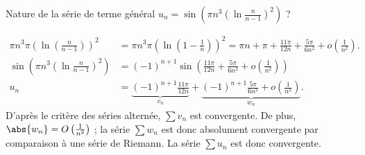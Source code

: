 \begin{enonce}
\begin{exercise}[ID={RMS121/2 E648,Mines-Pont PC},subtitle={},tags={}, difficulty={0}]
Nature de la série de terme général $u_n=\sin\left( \pi n^3\left( \ln\frac{n}{n-1} \right)^2  \right)$ ? 
\end{exercise}
\begin{solution}
\begin{align*}
    \pi n^3\pi \left(\ln\left( \frac{n}{n-1} \right) \right)^2 
&=\pi n^3\pi \left(\ln\left( 1-\frac1n \right) \right)^2 
  = \pi n+\pi +\frac{11\pi }{12 n}+\frac{5\pi }{6{n}^{2}}+o\left(\frac1{n^2}\right).\\
\sin\left( \pi n^3\left( \ln\frac{n}{n-1} \right)^2  \right)
  &= (-1)^{n+1}\sin\left( \frac{11\pi }{12 n}+\frac{5\pi }{6{n}^{2}} +o\left(\frac1{n^2}\right) \right) \\
  u_n&= \underbrace{(-1)^{n+1}\frac{11\pi}{12 n}}_{v_n} + \underbrace{(-1)^{n+1}\frac{5\pi}{6n^2} + o\left(\frac1{n^2}\right)}_{w_n}.
\end{align*}
  D'après le critère des séries alternée, $\sum v_n$ est convergente. De plus, $\abs{w_n}=O\left(\frac1{n^2}\right)$ ; la série $\sum w_n$ est donc absolument convergente par comparaison à une série de Riemann. La série $\sum u_n$ est donc convergente.
\end{solution}
\end{enonce}
